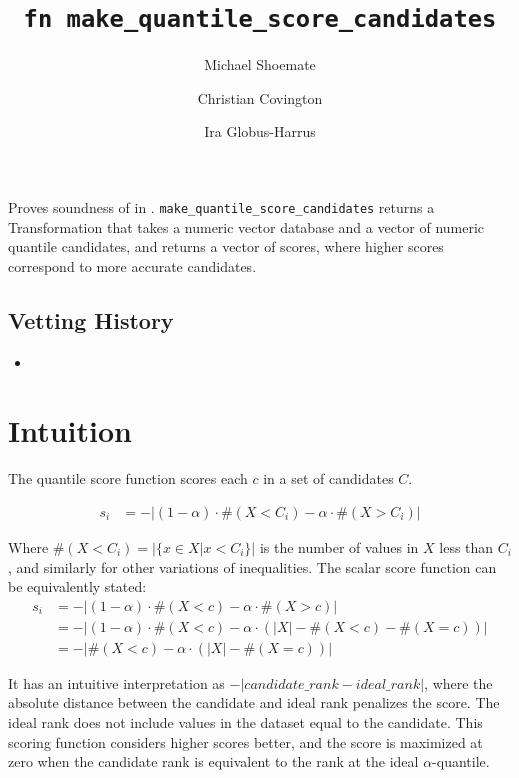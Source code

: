 \documentclass{article}
\title{\texttt{fn make\_quantile\_score\_candidates}}
\author{Michael Shoemate \and Christian Covington \and Ira Globus-Harrus}
\begin{document}
\maketitle  


\contrib

Proves soundness of  
in .
\texttt{make\_quantile\_score\_candidates} returns a Transformation that 
takes a numeric vector database and a vector of numeric quantile candidates,
and returns a vector of scores, where higher scores correspond to more accurate candidates.

\subsection*{Vetting History}
\begin{itemize}
    \item {}
\end{itemize}

\section{Intuition}
The quantile score function scores each $c$ in a set of candidates $C$.

\begin{equation}
\begin{array}{rl}
    s_i &= -|(1 - \alpha) \cdot \#(X < C_i) - \alpha \cdot \#(X > C_i)|
\end{array}
\end{equation}

Where $\#(X < C_i) = |\{x \in X | x < C_i\}|$ is the number of values in $X$ less than $C_i$, 
and similarly for other variations of inequalities.
The scalar score function can be equivalently stated:
\begin{align}
    s_i &= -|(1 - \alpha) \cdot \#(X < c) - \alpha \cdot \#(X > c)| \\
    &= -|(1 - \alpha) \cdot \#(X < c) - \alpha \cdot (|X| - \#(X < c) - \#(X = c))| \\
    &= -|\#(X < c) - \alpha \cdot (|X| - \#(X = c))|
\end{align}

It has an intuitive interpretation as $-|candidate\_rank - ideal\_rank|$, 
where the absolute distance between the candidate and ideal rank penalizes the score.
The ideal rank does not include values in the dataset equal to the candidate.
This scoring function considers higher scores better, 
and the score is maximized at zero when the candidate rank is equivalent to the rank at the ideal $\alpha$-quantile.
\end{document}
